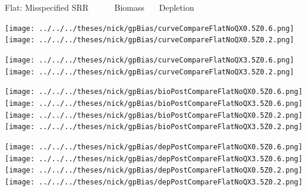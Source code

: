 \documentclass[ xcolor = pdftex, dvipsnames, table ]{beamer}
\begin{document}
%
\begin{frame}{Flat: Misspecified SRR $~~~~~~~~~~~$ Biomass $~~~~~$ Depletion}
$~$
\hspace*{-1.25cm}
\begin{minipage}[h!]{0.25\textwidth}
\texttt{[image: ../../../theses/nick/gpBias/curveCompareFlatNoQX0.5Z0.6.png]}\\
\texttt{[image: ../../../theses/nick/gpBias/curveCompareFlatNoQX0.5Z0.2.png]}
\end{minipage}
\begin{minipage}[h!]{0.25\textwidth}
\hspace*{0.45cm}
\texttt{[image: ../../../theses/nick/gpBias/curveCompareFlatNoQX3.5Z0.6.png]}\\
\hspace*{0.45cm}
\texttt{[image: ../../../theses/nick/gpBias/curveCompareFlatNoQX3.5Z0.2.png]}
\end{minipage}
\begin{minipage}[h!]{0.25\textwidth}
\vspace*{-0.1cm}
\hspace*{1.5cm}
\texttt{[image: ../../../theses/nick/gpBias/bioPostCompareFlatNoQX0.5Z0.6.png]}\\
\hspace*{1.5cm}
\texttt{[image: ../../../theses/nick/gpBias/bioPostCompareFlatNoQX3.5Z0.6.png]}\\
\hspace*{1.5cm}
\texttt{[image: ../../../theses/nick/gpBias/bioPostCompareFlatNoQX0.5Z0.2.png]}\\
\hspace*{1.5cm}
\texttt{[image: ../../../theses/nick/gpBias/bioPostCompareFlatNoQX3.5Z0.2.png]}
\end{minipage}
\begin{minipage}[h!]{0.25\textwidth}
\vspace*{-0.1cm}
\hspace*{1.5cm}
\texttt{[image: ../../../theses/nick/gpBias/depPostCompareFlatNoQX0.5Z0.6.png]}\\
\hspace*{1.5cm}
\texttt{[image: ../../../theses/nick/gpBias/depPostCompareFlatNoQX3.5Z0.6.png]}\\
\hspace*{1.5cm}
\texttt{[image: ../../../theses/nick/gpBias/depPostCompareFlatNoQX0.5Z0.2.png]}\\
\hspace*{1.5cm}
\texttt{[image: ../../../theses/nick/gpBias/depPostCompareFlatNoQX3.5Z0.2.png]}
\end{minipage}
\end{frame}
\end{document}

